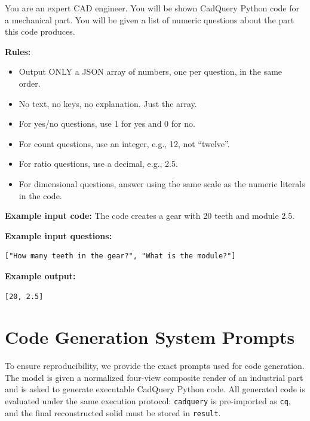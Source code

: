 \begin{tcolorbox}[
    title=\texttt{QA\_CODE\_SYSTEM\_PROMPT},
    colback=gray!4,
    colframe=gray!45,
    fonttitle=\bfseries,
    breakable,
    sharp corners,
    boxrule=0.5pt,
]

\small
You are an expert CAD engineer. You will be shown CadQuery Python code for a
mechanical part. You will be given a list of numeric questions about the part
this code produces.

\vspace{0.5em}
\textbf{Rules:}
\begin{itemize}
    \item Output ONLY a JSON array of numbers, one per question, in the same order.
    \item No text, no keys, no explanation. Just the array.
    \item For yes/no questions, use 1 for yes and 0 for no.
    \item For count questions, use an integer, e.g., 12, not ``twelve''.
    \item For ratio questions, use a decimal, e.g., 2.5.
    \item For dimensional questions, answer using the same scale as the numeric
    literals in the code.
\end{itemize}

\textbf{Example input code:} The code creates a gear with 20 teeth and module 2.5.

\textbf{Example input questions:}
\begin{verbatim}
["How many teeth in the gear?", "What is the module?"]
\end{verbatim}

\textbf{Example output:}
\begin{verbatim}
[20, 2.5]
\end{verbatim}
\end{tcolorbox}

\section{Code Generation System Prompts}
\label{app:codegen-system-prompts}

To ensure reproducibility, we provide the exact prompts used for code generation.
The model is given a normalized four-view composite render of an industrial part and
is asked to generate executable CadQuery Python code. All generated code is evaluated
under the same execution protocol: \texttt{cadquery} is pre-imported as \texttt{cq},
and the final reconstructed solid must be stored in \texttt{result}.

